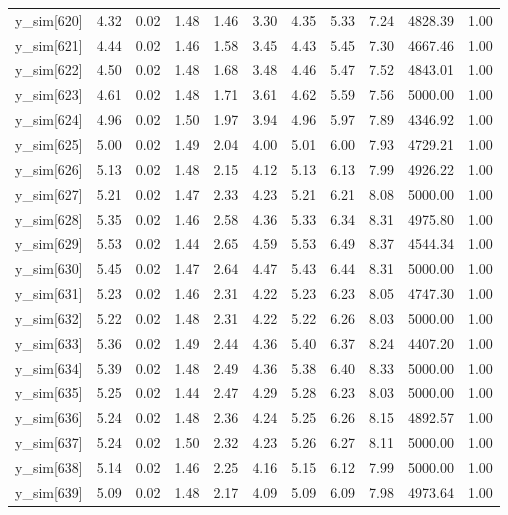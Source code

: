 \begin{table}[ht]
\begin{tabular}{rrrrrrrrrrr}
  y\_sim[620] & 4.32 & 0.02 & 1.48 & 1.46 & 3.30 & 4.35 & 5.33 & 7.24 & 4828.39 & 1.00 \\ 
  y\_sim[621] & 4.44 & 0.02 & 1.46 & 1.58 & 3.45 & 4.43 & 5.45 & 7.30 & 4667.46 & 1.00 \\ 
  y\_sim[622] & 4.50 & 0.02 & 1.48 & 1.68 & 3.48 & 4.46 & 5.47 & 7.52 & 4843.01 & 1.00 \\ 
  y\_sim[623] & 4.61 & 0.02 & 1.48 & 1.71 & 3.61 & 4.62 & 5.59 & 7.56 & 5000.00 & 1.00 \\ 
  y\_sim[624] & 4.96 & 0.02 & 1.50 & 1.97 & 3.94 & 4.96 & 5.97 & 7.89 & 4346.92 & 1.00 \\ 
  y\_sim[625] & 5.00 & 0.02 & 1.49 & 2.04 & 4.00 & 5.01 & 6.00 & 7.93 & 4729.21 & 1.00 \\ 
  y\_sim[626] & 5.13 & 0.02 & 1.48 & 2.15 & 4.12 & 5.13 & 6.13 & 7.99 & 4926.22 & 1.00 \\ 
  y\_sim[627] & 5.21 & 0.02 & 1.47 & 2.33 & 4.23 & 5.21 & 6.21 & 8.08 & 5000.00 & 1.00 \\ 
  y\_sim[628] & 5.35 & 0.02 & 1.46 & 2.58 & 4.36 & 5.33 & 6.34 & 8.31 & 4975.80 & 1.00 \\ 
  y\_sim[629] & 5.53 & 0.02 & 1.44 & 2.65 & 4.59 & 5.53 & 6.49 & 8.37 & 4544.34 & 1.00 \\ 
  y\_sim[630] & 5.45 & 0.02 & 1.47 & 2.64 & 4.47 & 5.43 & 6.44 & 8.31 & 5000.00 & 1.00 \\ 
  y\_sim[631] & 5.23 & 0.02 & 1.46 & 2.31 & 4.22 & 5.23 & 6.23 & 8.05 & 4747.30 & 1.00 \\ 
  y\_sim[632] & 5.22 & 0.02 & 1.48 & 2.31 & 4.22 & 5.22 & 6.26 & 8.03 & 5000.00 & 1.00 \\ 
  y\_sim[633] & 5.36 & 0.02 & 1.49 & 2.44 & 4.36 & 5.40 & 6.37 & 8.24 & 4407.20 & 1.00 \\ 
  y\_sim[634] & 5.39 & 0.02 & 1.48 & 2.49 & 4.36 & 5.38 & 6.40 & 8.33 & 5000.00 & 1.00 \\ 
  y\_sim[635] & 5.25 & 0.02 & 1.44 & 2.47 & 4.29 & 5.28 & 6.23 & 8.03 & 5000.00 & 1.00 \\ 
  y\_sim[636] & 5.24 & 0.02 & 1.48 & 2.36 & 4.24 & 5.25 & 6.26 & 8.15 & 4892.57 & 1.00 \\ 
  y\_sim[637] & 5.24 & 0.02 & 1.50 & 2.32 & 4.23 & 5.26 & 6.27 & 8.11 & 5000.00 & 1.00 \\ 
  y\_sim[638] & 5.14 & 0.02 & 1.46 & 2.25 & 4.16 & 5.15 & 6.12 & 7.99 & 5000.00 & 1.00 \\ 
  y\_sim[639] & 5.09 & 0.02 & 1.48 & 2.17 & 4.09 & 5.09 & 6.09 & 7.98 & 4973.64 & 1.00 \\ 

\end{tabular}
\end{table}
